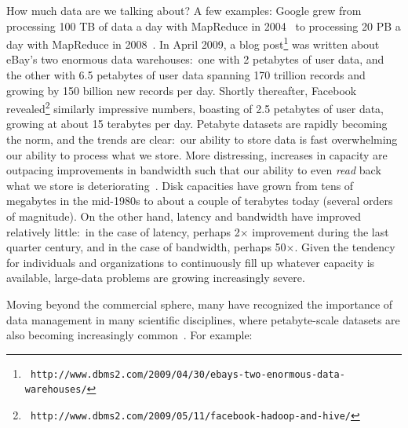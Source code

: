 How much data are we talking about?  A few examples: Google grew from
processing 100 TB of data a day with MapReduce in
2004~\cite{Dean_Ghemawat_OSDI2004} to processing 20 PB a day with
MapReduce in 2008~\cite{Dean_Ghemawat_CACM2008}.  In April 2009, a
blog post\footnote{\tt
  http://www.dbms2.com/2009/04/30/ebays-two-enormous-data-warehouses/}
was written about eBay's two enormous data warehouses:\ one with 2
petabytes of user data, and the other with 6.5 petabytes of user data
spanning 170 trillion records and growing by 150 billion new records
per day.  Shortly thereafter, Facebook revealed\footnote{\tt
  http://www.dbms2.com/2009/05/11/facebook-hadoop-and-hive/} similarly
impressive numbers, boasting of 2.5 petabytes of user data, growing at
about 15 terabytes per day.  Petabyte datasets are rapidly becoming
the norm, and the trends are clear:\ our ability to store data is fast
overwhelming our ability to process what we store.  More distressing,
increases in capacity are outpacing improvements in bandwidth such
that our ability to even {\it read} back what we store is
deteriorating~\cite{Leventhal_2009}.  Disk capacities have grown from
tens of megabytes in the mid-1980s to about a couple of terabytes
today (several orders of magnitude).  On the other hand, latency and
bandwidth have improved relatively little:\ in the case of latency,
perhaps 2$\times$ improvement during the last quarter century, and in
the case of bandwidth, perhaps 50$\times$.  Given the tendency for
individuals and organizations to continuously fill up whatever
capacity is available, large-data problems are growing increasingly
severe.

Moving beyond the commercial sphere, many have recognized the
importance of data management in many scientific disciplines, where
petabyte-scale datasets are also becoming increasingly
common~\cite{Bell_etal_2009}.  For example:

